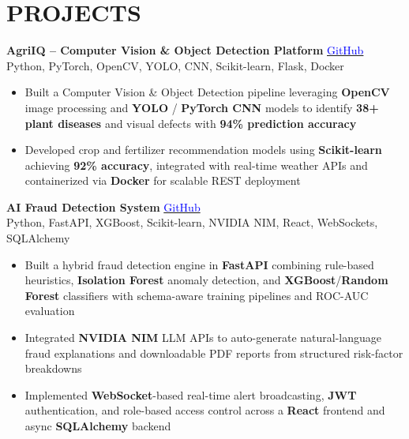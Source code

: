 \documentclass[10pt,a4paper]{article}
\begin{document}
\section*{PROJECTS}
\vspace{1pt}

\textbf{AgriIQ -- Computer Vision \& Object Detection Platform} \hfill \href{https://github.com/Ganeshpatne/Harvestify}{\textcolor{blue}{GitHub}}\\
{\small Python, PyTorch, OpenCV, YOLO, CNN, Scikit-learn, Flask, Docker}
\begin{itemize}
    \item Built a Computer Vision \& Object Detection pipeline leveraging \textbf{OpenCV} image processing and \textbf{YOLO} / \textbf{PyTorch CNN} models to identify \textbf{38+ plant diseases} and visual defects with \textbf{94\% prediction accuracy}
    \item Developed crop and fertilizer recommendation models using \textbf{Scikit-learn} achieving \textbf{92\% accuracy}, integrated with real-time weather APIs and containerized via \textbf{Docker} for scalable REST deployment
\end{itemize}

\vspace{1pt}

\textbf{AI Fraud Detection System} \hfill \href{https://github.com/Ganeshpatne/AI-Fraud-Detection}{\textcolor{blue}{GitHub}}\\
{\small Python, FastAPI, XGBoost, Scikit-learn, NVIDIA NIM, React, WebSockets, SQLAlchemy}
\begin{itemize}
    \item Built a hybrid fraud detection engine in \textbf{FastAPI} combining rule-based heuristics, \textbf{Isolation Forest} anomaly detection, and \textbf{XGBoost}/\textbf{Random Forest} classifiers with schema-aware training pipelines and ROC-AUC evaluation
    \item Integrated \textbf{NVIDIA NIM} LLM APIs to auto-generate natural-language fraud explanations and downloadable PDF reports from structured risk-factor breakdowns
    \item Implemented \textbf{WebSocket}-based real-time alert broadcasting, \textbf{JWT} authentication, and role-based access control across a \textbf{React} frontend and async \textbf{SQLAlchemy} backend
\end{itemize}

\vspace{1pt}
\end{document}
